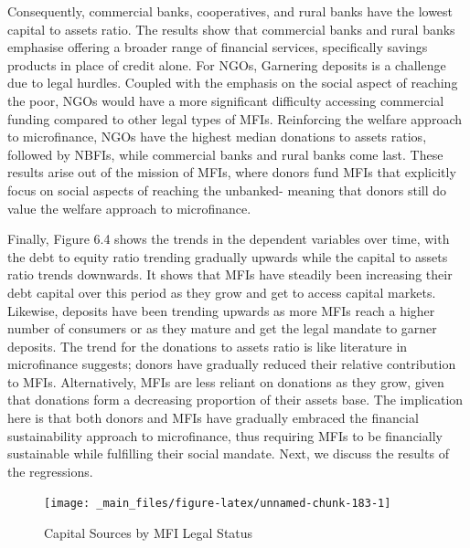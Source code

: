 \documentclass[a4paper, nobind]{templates/ociamthesis}
\begin{document}
Consequently, commercial banks, cooperatives, and rural banks have the lowest capital to assets ratio. The results show that commercial banks and rural banks emphasise offering a broader range of financial services, specifically savings products in place of credit alone. For NGOs, Garnering deposits is a challenge due to legal hurdles. Coupled with the emphasis on the social aspect of reaching the poor, NGOs would have a more significant difficulty accessing commercial funding compared to other legal types of MFIs. Reinforcing the welfare approach to microfinance, NGOs have the highest median donations to assets ratios, followed by NBFIs, while commercial banks and rural banks come last. These results arise out of the mission of MFIs, where donors fund MFIs that explicitly focus on social aspects of reaching the unbanked- meaning that donors still do value the welfare approach to microfinance.

Finally, Figure 6.4 shows the trends in the dependent variables over time, with the debt to equity ratio trending gradually upwards while the capital to assets ratio trends downwards. It shows that MFIs have steadily been increasing their debt capital over this period as they grow and get to access capital markets. Likewise, deposits have been trending upwards as more MFIs reach a higher number of consumers or as they mature and get the legal mandate to garner deposits. The trend for the donations to assets ratio is like literature in microfinance suggests; donors have gradually reduced their relative contribution to MFIs. Alternatively, MFIs are less reliant on donations as they grow, given that donations form a decreasing proportion of their assets base. The implication here is that both donors and MFIs have gradually embraced the financial sustainability approach to microfinance, thus requiring MFIs to be financially sustainable while fulfilling their social mandate. Next, we discuss the results of the regressions.

\begin{landscape}

\begin{figure}

{\centering \texttt{[image: \_main\_files/figure-latex/unnamed-chunk-183-1]} 

}

\caption{Capital Sources by MFI Legal Status}\label{fig:unnamed-chunk-183}
\end{figure}

\end{landscape}
\end{document}
